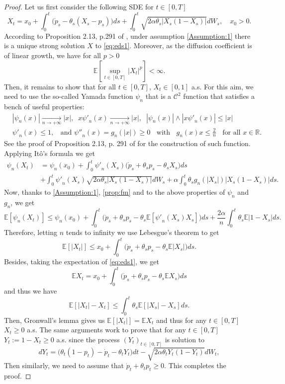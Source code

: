 \documentclass[11pt]{article}
\theoremstyle{definition}
\begin{document}
\begin{proof}
Let us first consider the following SDE for $t\in[0,T]$
\begin{equation}\label{eq:eds1}
X_t=x_0+  \int_0^t\big(\dot p_s - \theta_s(X_s-p_s)  \big)ds  + \int_0^t\sqrt{2\alpha \theta_s|X_s(1-X_s)|} dW_s, \quad x_0>0.
\end{equation}
According to Proposition 2.13, p.291 of \cite{KarShr}, under assumption  \eqref{Assumption:1} there is a unique strong solution $X$ to \eqref{eq:eds1}. Moreover, as the diffusion coefficient is of linear growth, we have  for all $p>0$ 
\begin{equation}\label{prop:fm}
\mathbb E[ \sup_{t\in[0,T]}|X_t|^p]<\infty.
\end{equation}
Then, it remains to show that for all $t\in[0,T]$, $X_t\in[0,1]$ a.s. For this aim, we need to use the so-called Yamada function $\psi_n$ that is a $\mathcal C^2$ function that satisfies a bench of useful properties:
\begin{align*}
&|\psi_n(x)|\underset{n\rightarrow+\infty}{\rightarrow}|x|, \;\; x{\psi'}_n(x)\underset{n\rightarrow+\infty}{\rightarrow}|x|, \;\; |\psi_n(x)|\wedge |x{\psi'}_n(x)| \le |x|\\
&{\psi'}_n(x)\le 1, \;\; \mbox{ and } {\psi''}_n(x)=g_n(|x|)\ge 0\;\; \mbox{ with } \;\; g_n(x)x\le \frac 2n\;\;  \mbox{ for all } x\in \mathbb R .
\end{align*}
See the proof of Proposition 2.13, p. 291 of \cite{KarShr} for the construction of such function.
Applying Itô's formula we get
\begin{align*}
\psi_n(X_t)&=\psi_n(x_0) +\int_0^t {\psi'}_n(X_s)(\dot p_s + \theta_s p_s - \theta_sX_s  \big)ds \\
&+ \int_0^t{\psi'}_n(X_s)\sqrt{2\alpha \theta_s|X_s(1-X_s)|} dW_s + \alpha \int_0^t \theta_sg_n(|X_s|)|X_s(1-X_s)|ds.
\end{align*}
Now, thanks to  \eqref{Assumption:1}, \eqref{prop:fm} and to the above properties of $\psi_n$ and $g_n$, we get
$$
\mathbb E[\psi_n(X_t)]\le \psi_n(x_0) +\int_0^t \big(\dot p_s + \theta_sp_s -  \theta_s \mathbb E[{\psi'}_n(X_s)X_s] \big)ds + \frac{2\alpha}{n}\int_0^t \theta_s\mathbb E |1-X_s|ds.
$$
Therefore, letting $n$ tends to infinity we use Lebesgue's theorem to get
$$
\mathbb E[|X_t|]\le x_0 +\int_0^t \big(\dot p_s + \theta_sp_s -  \theta_s \mathbb E|X_s| \big)ds.
$$
Besides, taking the expectation of \eqref{eq:eds1}, we get
$$
\mathbb E X_t=x_0+  \int_0^t\big(\dot p_s +\theta_sp_s - \theta_s \mathbb EX_s  \big)ds
$$
and thus we have 
$$
\mathbb E[|X_t| -X_t ]\le \int_0^t \theta_s \mathbb E[|X_s| - X_s ]ds.
$$
Then, Gronwall's lemma gives us $\mathbb E[|X_t|]=\mathbb E X_t$ and thus for any $t\in[0,T]$ $X_t\ge0$ a.s. The same arguments work to prove that  for any $t\in[0,T]$ $Y_t:=1-X_t\ge0$  a.s.  since the process $(Y_t)_{t\in[0,T]}$ is solution to 
$$
dY_t= \big( \theta_t(1-p_t) -\dot p_t - \theta_tY_t  \big)dt  -\sqrt{2\alpha \theta_tY_t(1-Y_t)} dW_t,
$$
Then similarly, we need to assume that $\dot p_t +\theta_tp_t\ge 0$. This completes the proof.
\end{proof}
\end{document}
